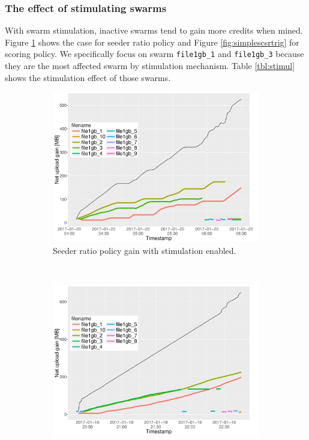\subsubsection{The effect of stimulating swarms}
With swarm stimulation, inactive swarms tend to gain more credits when mined. Figure \ref{fig:simplesrtrig} shows the case for seeder ratio policy and Figure \ref{fig:simplescsrtrig} for scoring policy. We specifically focus on swarm \texttt{file1gb\_1} and \texttt{file1gb\_3} because they are the most affected swarm by stimulation mechanism. Table \ref{tbl:stimul} shows the stimulation effect of those swarms.

\begin{figure}[b!]
	\begin{adjustwidth}{-1.5cm}{}
		\begin{subfigure}[t]{0.6\textwidth}
			\centering
			\includegraphics[width=\textwidth]{pics/results/simple3_sr_trig.pdf}
			\caption{Seeder ratio policy gain with stimulation enabled.}
			\label{fig:simplesrtrig}
		\end{subfigure}
		~
		\begin{subfigure}[t]{0.6\textwidth}
			\centering
			\includegraphics[width=\textwidth]{pics/results/simple1_scsr_trig.pdf}

\end{subfigure}
\end{adjustwidth}
\end{figure}
